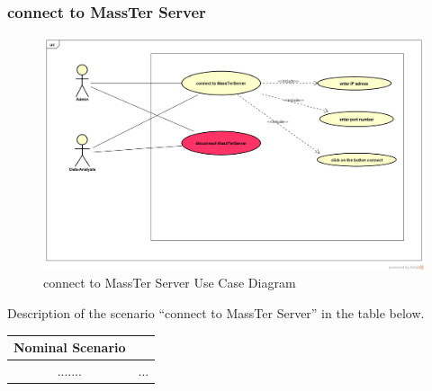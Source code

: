 \documentclass[12pt]{article}
\begin{document}
	 \subsubsection{connect to MassTer Server}
	 	\begin{figure}[h]
	 	\centering
	 	\includegraphics[width=1.0\textwidth]{connectToMassTerServer.png}
	 	\caption{connect to MassTer Server Use Case Diagram}
	 	
	 \end{figure}

  \newpage
 
 Description of the scenario ``connect to MassTer Server'' in the table below. 
 \\
 \begin{table}
 	\centering
 	\begin{tabular}{|c|p{10cm}|}
 		\hline
 		                        
 		\textbf{Nominal Scenario } & \\
 		\hline
 		....... & ... \\
 		
 		\hline
 	\end{tabular}
 \end{table}
 \clearpage
 \newpage
\end{document}
